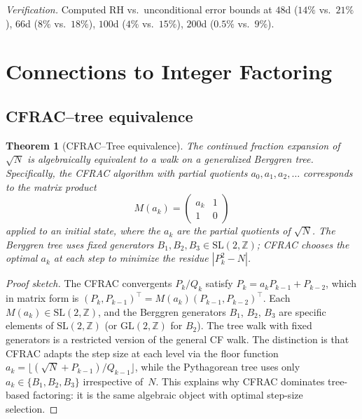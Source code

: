 \documentclass[12pt]{amsart}
\newtheorem{theorem}{Theorem}[section]
\theoremstyle{definition}
\theoremstyle{remark}
\begin{document}
\noindent
\textit{Verification.}  Computed RH vs.\ unconditional error bounds at
$48$d ($14\%$ vs.\ $21\%$), $66$d ($8\%$ vs.\ $18\%$), $100$d ($4\%$ vs.\ $15\%$),
$200$d ($0.5\%$ vs.\ $9\%$).


\section{Connections to Integer Factoring}\label{sec:factoring}

\subsection{CFRAC--tree equivalence}

\begin{theorem}[CFRAC--Tree equivalence]\label{thm:cfrac}
The continued fraction expansion of $\sqrt{N}$ is algebraically equivalent to a
walk on a generalized Berggren tree.  Specifically, the CFRAC algorithm with
partial quotients $a_{0},a_{1},a_{2},\ldots$ corresponds to the matrix product
\[
  M(a_{k}) = \begin{pmatrix} a_{k} & 1 \\ 1 & 0 \end{pmatrix}
\]
applied to an initial state, where the $a_{k}$ are the partial quotients of
$\sqrt{N}$.  The Berggren tree uses fixed generators
$B_{1},B_{2},B_{3}\in\mathrm{SL}(2,\mathbb{Z})$; CFRAC chooses the optimal
$a_{k}$ at each step to minimize the residue $|P_{k}^{2}-N|$.
\end{theorem}

\begin{proof}[Proof sketch]
The CFRAC convergents $P_{k}/Q_{k}$ satisfy $P_{k}=a_{k}P_{k-1}+P_{k-2}$,
which in matrix form is
$(P_{k},P_{k-1})^{\top}=M(a_{k})(P_{k-1},P_{k-2})^{\top}$.
Each $M(a_{k})\in\mathrm{SL}(2,\mathbb{Z})$, and the Berggren generators
$B_{1}$, $B_{2}$, $B_{3}$ are specific elements of $\mathrm{SL}(2,\mathbb{Z})$
(or $\mathrm{GL}(2,\mathbb{Z})$ for $B_{2}$).  The tree walk with fixed
generators is a restricted version of the general CF walk.  The distinction is
that CFRAC adapts the step size at each level via the floor function
$a_{k}=\lfloor(\sqrt{N}+P_{k-1})/Q_{k-1}\rfloor$, while the Pythagorean tree
uses only $a_{k}\in\{B_{1},B_{2},B_{3}\}$ irrespective of~$N$.  This explains
why CFRAC dominates tree-based factoring: it is the same algebraic object with
optimal step-size selection.
\end{proof}
\end{document}
